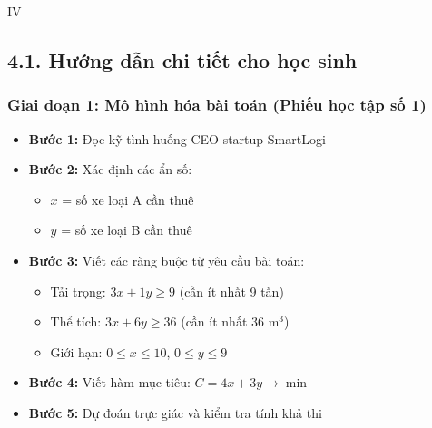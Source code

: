 \documentclass[12pt,a4paper]{article}
\begin{document}
\begin{competitionsection}{IV}
\vspace{0.5cm}
\subsection*{4.1. Hướng dẫn chi tiết cho học sinh}
\subsubsection*{Giai đoạn 1: Mô hình hóa bài toán (Phiếu học tập số 1)}
\begin{itemize}[leftmargin=*,noitemsep]
\item \textbf{Bước 1:} Đọc kỹ tình huống CEO startup SmartLogi
\item \textbf{Bước 2:} Xác định các ẩn số:
    \begin{itemize}
    \item $x$ = số xe loại A cần thuê
    \item $y$ = số xe loại B cần thuê
    \end{itemize}
\item \textbf{Bước 3:} Viết các ràng buộc từ yêu cầu bài toán:
    \begin{itemize}
    \item Tải trọng: $3x + 1y \ge 9$ (cần ít nhất 9 tấn)
    \item Thể tích: $3x + 6y \ge 36$ (cần ít nhất 36 m$^3$)
    \item Giới hạn: $0 \le x \le 10$, $0 \le y \le 9$
    \end{itemize}
\item \textbf{Bước 4:} Viết hàm mục tiêu: $C = 4x + 3y \to \min$
\item \textbf{Bước 5:} Dự đoán trực giác và kiểm tra tính khả thi
\end{itemize}


\end{competitionsection}
\end{document}
